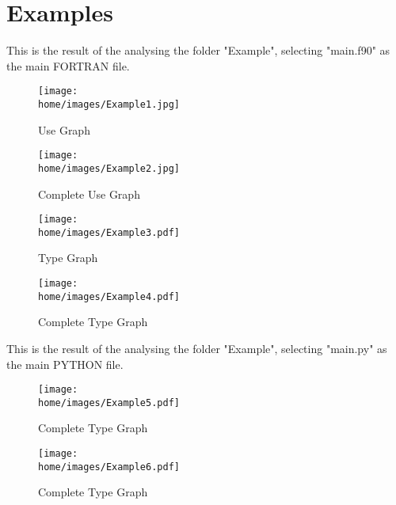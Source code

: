 \newpage

\section*{Examples}

This is the result of the analysing the folder "Example", selecting "main.f90" as the main FORTRAN file.

\begin{figure}[H]
    \begin{center}
        \texttt{[image: \\home/images/Example1.jpg]}
        \caption{Use Graph}
    \end{center}
\end{figure}

\begin{figure}[H]
    \begin{center}
        \texttt{[image: \\home/images/Example2.jpg]}
        \caption{Complete Use Graph}
    \end{center}
\end{figure}


\begin{figure}[H]
    \begin{center}
        \texttt{[image: \\home/images/Example3.pdf]}
        \caption{Type Graph}
    \end{center}
\end{figure}


\begin{figure}[H]
    \begin{center}
        \texttt{[image: \\home/images/Example4.pdf]}
        \caption{Complete Type Graph}
    \end{center}
\end{figure}
\newpage

This is the result of the analysing the folder "Example", selecting "main.py" as the main PYTHON file.

\begin{figure}[H]
    \begin{center}
        \texttt{[image: \\home/images/Example5.pdf]}
        \caption{Complete Type Graph}
    \end{center}
\end{figure}
\begin{figure}[H]
\begin{center}
    \texttt{[image: \\home/images/Example6.pdf]}
    \caption{Complete Type Graph}
\end{center}
\end{figure}